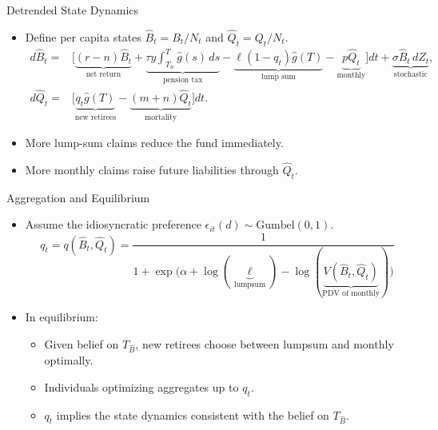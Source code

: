 \documentclass[11pt, aspectratio=169]{beamer}
\begin{document}
\begin{frame}{Detrended State Dynamics}
    \begin{itemize}[<+->]
        \item Define per capita states
        $\hat B_t=B_t/N_t$ and $\hat Q_t=Q_t/N_t$.
        \begin{align*}
            d\hat B_t={}&\big[
            \underbrace{(r-n)\hat B_t}_{\text{net return}}
            +\underbrace{\tau y\int_{T_w}^{T}\hat g(s)\,ds}_{\text{pension tax}}
            -\underbrace{\ell(1-q_t)\hat g(T)}_{\text{lump sum}}
            -\underbrace{p\hat Q_t}_{\text{monthly}}\big]dt
            +\underbrace{\sigma\hat B_t\,dZ_t}_{\text{stochastic}},\\
            d\hat Q_t={}&\big[
            \underbrace{q_t\hat g(T)}_{\text{new retirees}}
            -\underbrace{(m+n)\hat Q_t}_{\text{mortality}}\big]dt.
        \end{align*}
        \item More lump-sum claims reduce the fund immediately.
        \item More monthly claims raise future liabilities through $\hat Q_t$.
    \end{itemize}
\end{frame}

\begin{frame}{Aggregation and Equilibrium}
    \begin{itemize}[<+->]
        \item Assume the idiosyncratic preference $\epsilon_{it}(d)\sim \text{Gumbel}(0, 1)$. 
        \begin{equation*}
            q_t = q(\hat{B}_t, \hat{Q}_t) = \frac{1}{1+\exp\big(\alpha+\log(\underbrace{\ell}_{\text{lumpsum}})-\log(\underbrace{V(\hat B_t,\hat Q_t)}_{\text{PDV of monthly}})\big)}
        \end{equation*}
        \item In equilibrium: 
        \begin{itemize}[<+->]
            \item[-] Given belief on $T_{\hat{B}}$, new retirees choose between lumpsum and monthly optimally. 
            \item[-] Individuals optimizing aggregates up to $q_t$.  
            \item[-] $q_t$ implies the state dynamics consistent with the belief on $T_{\hat{B}}$.
        \end{itemize}
    \end{itemize}
    
\end{frame}
\end{document}
